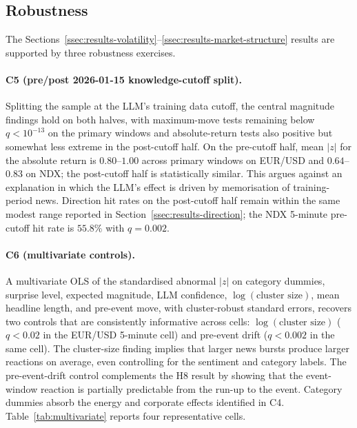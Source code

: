 \subsection{Robustness}
\label{ssec:results-robustness}

The Sections~\ref{ssec:results-volatility}--\ref{ssec:results-market-structure}
results are supported by three robustness exercises.

\paragraph{C5 (pre/post 2026-01-15 knowledge-cutoff split).}
Splitting the sample at the LLM's training data cutoff, the central
magnitude findings hold on both halves, with maximum-move tests
remaining below $q < 10^{-13}$ on the primary windows and
absolute-return tests also positive but somewhat less extreme in
the post-cutoff half. On the pre-cutoff half, mean $|z|$ for the absolute
return is $0.80$--$1.00$ across primary windows on EUR/USD and
$0.64$--$0.83$ on NDX; the post-cutoff half is statistically
similar. This argues against an explanation in which the LLM's
effect is driven by memorisation of training-period news. Direction
hit rates on the post-cutoff half remain within the same modest
range reported in Section~\ref{ssec:results-direction}; the NDX
5-minute pre-cutoff hit rate is $55.8\%$ with $q = 0.002$.

\paragraph{C6 (multivariate controls).}
A multivariate OLS of the standardised abnormal $|z|$ on category
dummies, surprise level, expected magnitude, LLM confidence,
$\log(\text{cluster size})$, mean headline length, and pre-event
move, with cluster-robust standard errors, recovers two controls
that are consistently informative across cells:
$\log(\text{cluster size})$ ($q < 0.02$ in the EUR/USD 5-minute
cell) and pre-event drift ($q < 0.002$ in the same cell). The
cluster-size finding implies that larger news bursts produce larger
reactions on average, even controlling for the sentiment and
category labels. The pre-event-drift control complements the H8
result by showing that the event-window reaction is partially
predictable from the run-up to the event. Category dummies absorb
the energy and corporate effects identified in C4.
Table~\ref{tab:multivariate} reports four representative cells.



